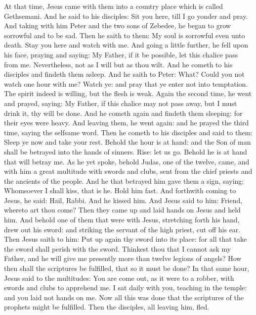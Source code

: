 

At that time, Jesus came with them into a country place which is called Gethsemani. And
he said to his disciples: Sit you here, till I go yonder and pray.  And taking
with him Peter and the two sons of Zebedee, he began to grow sorrowful and to
be sad.  Then he saith to them: My soul is sorrowful even unto death. Stay you
here and watch with me.  And going a little further, he fell upon his face,
praying and saying: My Father, if it be possible, let this chalice pass from
me.  Nevertheless, not as I will but as thou wilt.  And he cometh to his
disciples and findeth them asleep. And he saith to Peter: What? Could you not
watch one hour with me?  Watch ye: and pray that ye enter not into temptation.
The spirit indeed is willing, but the flesh is weak.  Again the second time, he
went and prayed, saying: My Father, if this chalice may not pass away, but I
must drink it, thy will be done.  And he cometh again and findeth them
sleeping: for their eyes were heavy.  And leaving them, he went again: and he
prayed the third time, saying the selfsame word.  Then he cometh to his
disciples and said to them: Sleep ye now and take your rest. Behold the hour is
at hand: and the Son of man shall be betrayed into the hands of sinners.  Rise:
let us go. Behold he is at hand that will betray me.  As he yet spoke, behold
Judas, one of the twelve, came, and with him a great multitude with swords and
clubs, sent from the chief priests and the ancients of the people.  And he that
betrayed him gave them a sign, saying: Whomsoever I shall kiss, that is he.
Hold him fast.  And forthwith coming to Jesus, he said: Hail, Rabbi. And he
kissed him.  And Jesus said to him: Friend, whereto art thou come? Then they
came up and laid hands on Jesus and held him.  And behold one of them that were
with Jesus, stretching forth his hand, drew out his sword: and striking the
servant of the high priest, cut off his ear.  Then Jesus saith to him: Put up
again thy sword into its place: for all that take the sword shall perish with
the sword.  Thinkest thou that I cannot ask my Father, and he will give me
presently more than twelve legions of angels?  How then shall the scriptures be
fulfilled, that so it must be done?  In that same hour, Jesus said to the
multitudes: You are come out, as it were to a robber, with swords and clubs to
apprehend me. I sat daily with you, teaching in the temple: and you laid not
hands on me.  Now all this was done that the scriptures of the prophets might
be fulfilled. Then the disciples, all leaving him, fled.  

